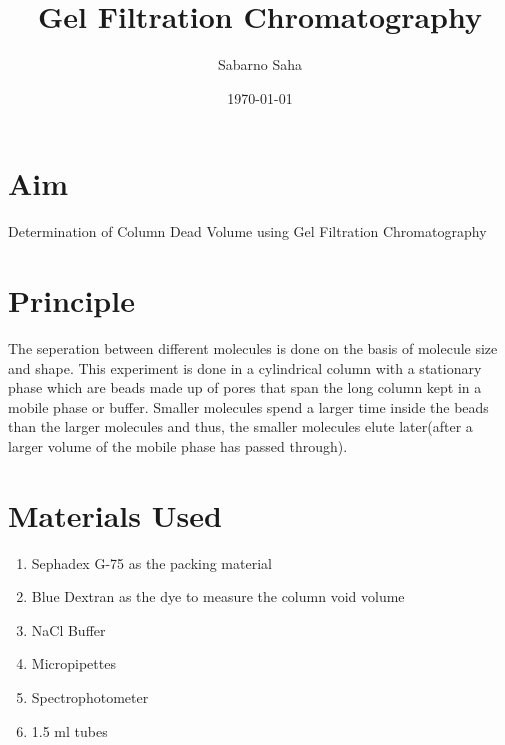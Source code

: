 \documentclass{article}
\begin{document}
    \title{Gel Filtration Chromatography}
    \author{Sabarno Saha}
    \date{\today}
    \maketitle
    \section{Aim}
        Determination of Column Dead Volume using Gel Filtration Chromatography
        \section{Principle}
        The seperation between different molecules is done on the basis of molecule size and shape. This experiment is done in a cylindrical column with a stationary phase 
        which are beads made up of pores that span the long column kept in a mobile phase or buffer. Smaller molecules spend a larger time inside the beads than the larger molecules and 
        thus, the smaller molecules elute later(after a larger volume of the mobile phase has passed through).
        \section{Materials Used}
        \begin{enumerate}
            \item Sephadex G-75 as the packing material
            \item Blue Dextran as the dye to measure the column void volume
            \item NaCl Buffer
            \item Micropipettes
            \item Spectrophotometer
            \item 1.5 ml tubes
        \end{enumerate}
\end{document}
